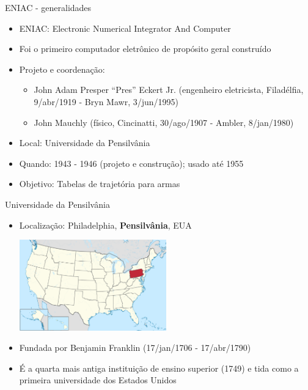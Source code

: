 \begin{slide}[toc=]{ENIAC - generalidades}
   \begin{itemize}
      \item ENIAC: Electronic Numerical Integrator And Computer
      \item Foi o primeiro computador eletrônico de propósito geral construído
      \item Projeto e coordenação: 
      \begin{itemize}
         \item John Adam Presper ``Pres'' Eckert Jr. (engenheiro eletricista, Filadélfia, 9/abr/1919 - Bryn Mawr, 3/jun/1995)
         \item John Mauchly  (físico, Cincinatti, 30/ago/1907 - Ambler, 8/jan/1980)
      \end{itemize}
      \item Local: Universidade da Pensilvânia
      \item Quando: 1943 - 1946 (projeto e construção); usado até 1955
      \item Objetivo: Tabelas de trajetória para armas
   \end{itemize}
\end{slide}
\begin{note}{Universidade da Pensilvânia}
   \begin{itemize}
      \item Localização: Philadelphia, \textbf{Pensilvânia}, EUA
      \begin{center}
         \includegraphics[width=0.5\textwidth]{figs/Pennsylvania_in_United_States.eps}
      \end{center}
      \item Fundada por Benjamin Franklin (17/jan/1706 - 17/abr/1790) 
      \item É a quarta mais antiga instituição de ensino superior (1749) e tida como a primeira universidade dos Estados Unidos 
   \end{itemize}
\end{note}

